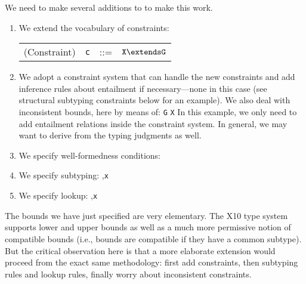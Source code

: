 We need to make several additions to \FXG to make this work.
\begin{enumerate}
\item We extend the vocabulary of constraints:
\begin{center}
\begin{tabular}{r@{\quad}rcl}
  (Constraint) & {\tt c} &{::=}& $\tt X\extends G$ \\
\end{tabular}
\end{center}
\item We adopt a constraint system that can handle the new constraints and add inference rules about entailment if necessary---none in this case (see structural subtyping constraints below for an example). We also deal with inconsistent bounds, here by means of:
\vspace{-\medskipamount}
\infrule
	{{\tt G}}
	{{\tt X}\vdashX\false}
\vspace{-\medskipamount}
In this example, we only need to add entailment relations inside the constraint system. In general, we may want to derive \false{} from the typing judgments as well.

\item We specify well-formedness conditions:
\vspace{-\medskipamount}
\infrule
	{ \andalso {}}
	{}
\vspace{-\medskipamount}
\item We specify subtyping:
\vspace{-\medskipamount}
\infrule
	{ \andalso \Gamma{}}
	{\Gamma,{\tt x}}
\vspace{-\medskipamount}
\item We specify lookup:
\vspace{-\medskipamount}
\infrule
	{ \andalso \Gamma{}}
	{\Gamma,{\tt x}}
\vspace{-\medskipamount}
\end{enumerate}

The bounds we have just specified are very elementary. The X10 type system supports lower and upper bounds as well as a much more permissive notion of compatible bounds (i.e., bounds are compatible if they have a common subtype). But the critical observation here is that a more elaborate extension would proceed from the exact same methodology: first add constraints, then subtyping rules and lookup rules, finally worry about inconsistent constraints.

